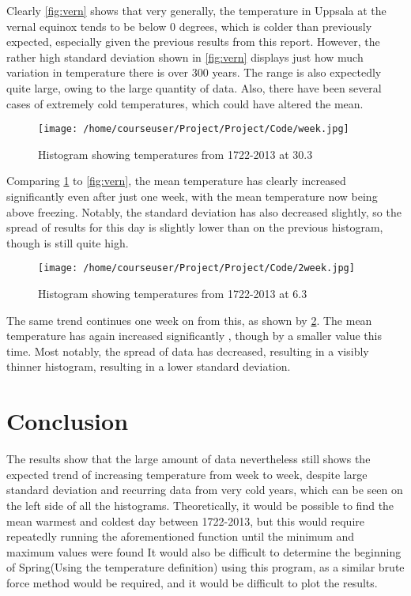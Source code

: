 \documentclass[a4paper,10pt,oneside]{article}
\begin{document}
Clearly \ref{fig:vern} shows that very generally, the temperature in Uppsala at the
vernal equinox tends to be below 0 degrees, which is colder than previously expected, especially given the previous
results from this report. However, the rather high standard deviation
shown in \ref{fig:vern} displays just how much variation in temperature there is over 300 years.
The range is also expectedly quite large, owing to the large quantity of data. Also, there have been several cases of extremely
cold temperatures, which could have altered the mean.

\begin{figure}
 \texttt{[image: /home/courseuser/Project/Project/Code/week.jpg]}
 \caption{Histogram showing temperatures from 1722-2013 at 30.3}
 \label{fig:week}
\end{figure}

Comparing \ref{fig:week} to \ref{fig:vern}, the mean temperature has clearly increased significantly even
after just one week, with the mean temperature now being above freezing. Notably, the standard deviation
has also decreased slightly, so the spread of results for this day is slightly lower than on the previous histogram, though is
still quite high.

\begin{figure}
 \texttt{[image: /home/courseuser/Project/Project/Code/2week.jpg]}
 \caption{Histogram showing temperatures from 1722-2013 at 6.3}
 \label{fig:twoweek}
\end{figure}

The same trend continues one week on from this, as shown by \ref{fig:twoweek}. The mean temperature has again increased significantly
, though by a smaller value this time. Most notably, the spread of data has decreased, resulting in a visibly thinner histogram, resulting
in a lower standard deviation.

\section{Conclusion}
\label{sec:conc}

The results show that the large amount of data nevertheless still shows the expected trend of increasing temperature from week
to week, despite large standard deviation and recurring data from very cold years, which can be seen on
the left side of all the histograms. Theoretically, it would be possible to find the mean warmest and coldest day between 1722-2013,
but this would require repeatedly running the aforementioned function until the minimum and maximum values were found
It would also be difficult to determine the beginning of Spring(Using the temperature definition) using this program,
as a similar brute force method would be required, and it would be difficult to plot the results.






 
\end{document}
